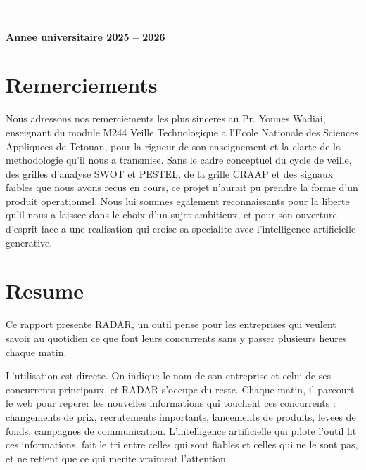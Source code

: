\documentclass[12pt,a4paper,openany]{report}
\begin{document}
\begin{titlepage}
  \vspace{1cm}

  {\color{ensaBlueLight}\rule{0.4\linewidth}{0.4pt}}\\[8pt]
  {\sffamily\large\color{ensaBlue}\textbf{Annee universitaire 2025 -- 2026}}

\end{titlepage}

\chapter*{Remerciements}
\thispagestyle{empty}

\vspace{2cm}

Nous adressons nos remerciements les plus sinceres au Pr. Younes Wadiai, enseignant du module M244 Veille Technologique a l'Ecole Nationale des Sciences Appliquees de Tetouan, pour la rigueur de son enseignement et la clarte de la methodologie qu'il nous a transmise. Sans le cadre conceptuel du cycle de veille, des grilles d'analyse SWOT et PESTEL, de la grille CRAAP et des signaux faibles que nous avons recus en cours, ce projet n'aurait pu prendre la forme d'un produit operationnel. Nous lui sommes egalement reconnaissants pour la liberte qu'il nous a laissee dans le choix d'un sujet ambitieux, et pour son ouverture d'esprit face a une realisation qui croise sa specialite avec l'intelligence artificielle generative.

\vfill

\chapter*{Resume}

Ce rapport presente RADAR, un outil pense pour les entreprises qui veulent savoir au quotidien ce que font leurs concurrents sans y passer plusieurs heures chaque matin.

L'utilisation est directe. On indique le nom de son entreprise et celui de ses concurrents principaux, et RADAR s'occupe du reste. Chaque matin, il parcourt le web pour reperer les nouvelles informations qui touchent ces concurrents : changements de prix, recrutements importants, lancements de produits, levees de fonds, campagnes de communication. L'intelligence artificielle qui pilote l'outil lit ces informations, fait le tri entre celles qui sont fiables et celles qui ne le sont pas, et ne retient que ce qui merite vraiment l'attention.
\end{document}
